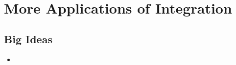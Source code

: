 \chapter{More Applications of Integration}
\label{chap:MAI}

\section{Big Ideas}
\label{sec:MAI Big Ideas}
\begin{itemize}
  \item 
\end{itemize}